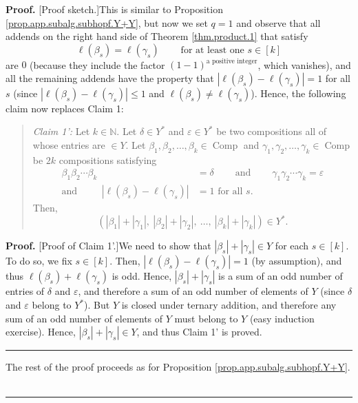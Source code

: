 \documentclass[numbers=enddot,12pt,final,onecolumn,notitlepage]{scrartcl}%
\theoremstyle{definition}
\newenvironment{statement}{\begin{quote}}{\end{quote}}
\newenvironment{proof}[1][Proof]{\noindent\textbf{#1.} }{\ \rule{0.5em}{0.5em}}
\begin{document}
\begin{proof}
[Proof sketch.]This is similar to Proposition
\ref{prop.app.subalg.subhopf.Y+Y}, but now we set $q=1$ and observe that all
addends on the right hand side of Theorem \ref{thm.product.1} that satisfy%
\[
\ell\left(  \beta_{s}\right)  =\ell\left(  \gamma_{s}\right)
\ \ \ \ \ \ \ \ \ \ \text{for at least one }s\in\left[  k\right]
\]
are $0$ (because they include the factor $\left(  1-1\right)  ^{\text{a
positive integer}}$, which vanishes), and all the remaining addends have the
property that $\left\vert \ell\left(  \beta_{s}\right)  -\ell\left(
\gamma_{s}\right)  \right\vert =1$ for all $s$ (since $\left\vert \ell\left(
\beta_{s}\right)  -\ell\left(  \gamma_{s}\right)  \right\vert \leq1$ and
$\ell\left(  \beta_{s}\right)  \neq\ell\left(  \gamma_{s}\right)  $). Hence,
the following claim now replaces Claim 1:

\begin{statement}
\textit{Claim 1':} Let $k\in\mathbb{N}$. Let $\delta\in Y^{\ast}$ and
$\varepsilon\in Y^{\ast}$ be two compositions all of whose entries are $\in
Y$. Let $\beta_{1},\beta_{2},\ldots,\beta_{k}\in\operatorname*{Comp}$ and
$\gamma_{1},\gamma_{2},\ldots,\gamma_{k}\in\operatorname*{Comp}$ be $2k$
compositions satisfying%
\begin{align*}
\beta_{1}\beta_{2}\cdots\beta_{k}  &  =\delta\ \ \ \ \ \ \ \ \ \ \text{and}%
\ \ \ \ \ \ \ \ \ \ \gamma_{1}\gamma_{2}\cdots\gamma_{k}=\varepsilon\\
\text{and }\ \ \ \ \ \ \ \ \ \ \left\vert \ell\left(  \beta_{s}\right)
-\ell\left(  \gamma_{s}\right)  \right\vert  &  =1\text{ for all }s.
\end{align*}
Then,
\[
\left(  \left\vert \beta_{1}\right\vert +\left\vert \gamma_{1}\right\vert
,\ \left\vert \beta_{2}\right\vert +\left\vert \gamma_{2}\right\vert
,\ \ldots,\ \left\vert \beta_{k}\right\vert +\left\vert \gamma_{k}\right\vert
\right)  \in Y^{\ast}.
\]

\end{statement}

\begin{proof}
[Proof of Claim 1'.]We need to show that $\left\vert \beta_{s}\right\vert
+\left\vert \gamma_{s}\right\vert \in Y$ for each $s\in\left[  k\right]  $. To
do so, we fix $s\in\left[  k\right]  $. Then, $\left\vert \ell\left(
\beta_{s}\right)  -\ell\left(  \gamma_{s}\right)  \right\vert =1$ (by
assumption), and thus $\ell\left(  \beta_{s}\right)  +\ell\left(  \gamma
_{s}\right)  $ is odd. Hence, $\left\vert \beta_{s}\right\vert +\left\vert
\gamma_{s}\right\vert $ is a sum of an odd number of entries of $\delta$ and
$\varepsilon$, and therefore a sum of an odd number of elements of $Y$ (since
$\delta$ and $\varepsilon$ belong to $Y^{\ast}$). But $Y$ is closed under
ternary addition, and therefore any sum of an odd number of elements of $Y$
must belong to $Y$ (easy induction exercise). Hence, $\left\vert \beta
_{s}\right\vert +\left\vert \gamma_{s}\right\vert \in Y$, and thus Claim 1' is proved.
\end{proof}

The rest of the proof proceeds as for Proposition
\ref{prop.app.subalg.subhopf.Y+Y}.
\end{proof}
\end{document}

